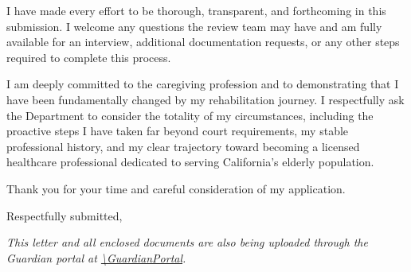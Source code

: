 \vspace{0.5em}
I have made every effort to be thorough, transparent, and forthcoming in this submission. I welcome any questions the review team may have and am fully available for an interview, additional documentation requests, or any other steps required to complete this process.

I am deeply committed to the caregiving profession and to demonstrating that I have been fundamentally changed by my rehabilitation journey. I respectfully ask the Department to consider the totality of my circumstances, including the proactive steps I have taken far beyond court requirements, my stable professional history, and my clear trajectory toward becoming a licensed healthcare professional dedicated to serving California's elderly population.

Thank you for your time and careful consideration of my application.

\vspace{1em}
\noindent Respectfully submitted,

\signatureline{\ApplicantName}
\datefield

\vspace{1em}
{\small\textit{This letter and all enclosed documents are also being uploaded through the Guardian portal at \url{\GuardianPortal}.}}
